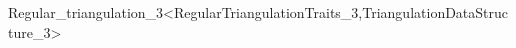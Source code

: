 \begin{ccRefClass}{Regular_triangulation_3<RegularTriangulationTraits_3,TriangulationDataStructure_3>}
\begin{ccAdvanced}
\end{ccAdvanced}




\end{ccRefClass}
